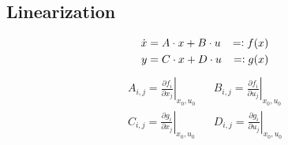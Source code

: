 \subsection{Linearization}
    \begin{align*}
        \dot{x} &= A \cdot x + B \cdot u &=\vcentcolon f(x)\\
              y &= C \cdot x + D \cdot u &=\vcentcolon g(x)
    \end{align*}
    \begin{align*}
        A_{i,j} = \left. \frac{\partial f_i}{\partial x_j} \right\rvert_{x_0,u_0} && B_{i,j} = \left. \frac{\partial f_i}{\partial u_j} \right\rvert_{x_0,u_0}\\
        C_{i,j} = \left. \frac{\partial g_i}{\partial x_j} \right\rvert_{x_0,u_0} && D_{i,j} = \left. \frac{\partial g_i}{\partial u_j} \right\rvert_{x_0,u_0}
    \end{align*}